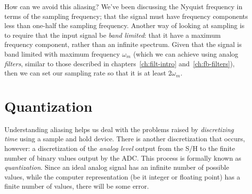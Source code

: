 How can we avoid this aliasing? We've been discussing the Nyquist
frequency in terms of the sampling frequency; that the signal must
have frequency components less than one-half the sampling frequency.
Another way of looking at sampling is to require that the input signal
be \emph{band limited}: that it have a maximum frequency component,
rather than an infinite spectrum. Given that the signal is band
limited with maximum frequency $\omega_m$ (which we can achieve using
analog \emph{filters}, similar to those described in
chapters~\ref{ch:filt-intro} and~\ref{ch:fb-filters}), then we can set
our sampling rate so that it is at least $2\omega_m$.



\section{Quantization}

Understanding aliasing helps us deal with the problems raised by \emph{discretizing time} using
a sample and hold device. There is another discretization that occurs,
however: a discretization of the \emph{analog level} output from the S/H to
the finite number of binary values output by the ADC. This process is
formally known as \emph{quantization}. Since an ideal analog signal
has an infinite number of possible values, while the computer
representation (be it integer or floating point) has a finite number
of values, there will be some error.

